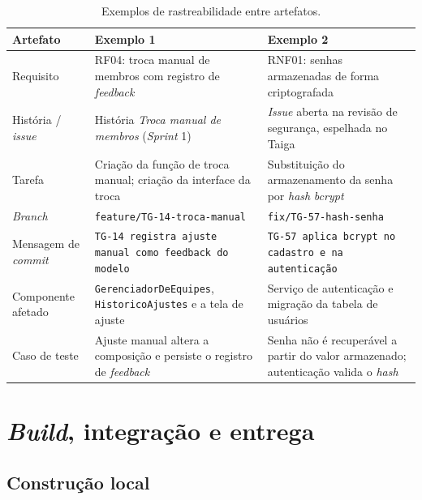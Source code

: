 \documentclass[a4paper,12pt,oneside,openany]{book}
\newif\iforientacoes
\newcommand{\orientacao}[1]{%
    \iforientacoes
        \begin{quote}
        \small\itshape\textbf{Orientação:} #1
        \end{quote}
    \fi
}
\begin{document}
\begin{table}[H]
\centering
\caption{Exemplos de rastreabilidade entre artefatos.}
\label{tab:rastreabilidade}
\begin{tabularx}{0.95\textwidth}{p{} X X}
\toprule
\textbf{Artefato} & \textbf{Exemplo 1} & \textbf{Exemplo 2} \\
\midrule
Requisito & RF04: troca manual de membros com registro de
\textit{feedback} & RNF01: senhas armazenadas de forma criptografada \\
História / \textit{issue} & História \textit{Troca manual de membros}
(\textit{Sprint} 1) & \textit{Issue} aberta na revisão de segurança, espelhada
no Taiga \\
Tarefa & Criação da função de troca manual; criação da interface da troca &
Substituição do armazenamento da senha por \textit{hash} \textit{bcrypt} \\
\textit{Branch} & \texttt{feature/TG-14-troca-manual} &
\texttt{fix/TG-57-hash-senha} \\
Mensagem de \textit{commit} & \texttt{TG-14 registra ajuste manual como
feedback do modelo} & \texttt{TG-57 aplica bcrypt no cadastro e na
autenticação} \\
Componente afetado & \texttt{GerenciadorDeEquipes},
\texttt{HistoricoAjustes} e a tela de ajuste & Serviço de autenticação e
migração da tabela de usuários \\
Caso de teste & Ajuste manual altera a composição e persiste o registro de
\textit{feedback} & Senha não é recuperável a partir do valor armazenado;
autenticação valida o \textit{hash} \\
\bottomrule
\end{tabularx}
\end{table}

\section{\textit{Build}, integração e entrega}

\orientacao{Descrevam como o software é construído e executado. Se houver
automação de \textit{build}, testes, integração contínua ou
entrega/\textit{deploy}, apresentem o fluxo adotado e as ferramentas
envolvidas. Caso essas práticas não sejam utilizadas, expliquem brevemente
como o processo é realizado manualmente.}

\subsection{Construção local}
\end{document}
